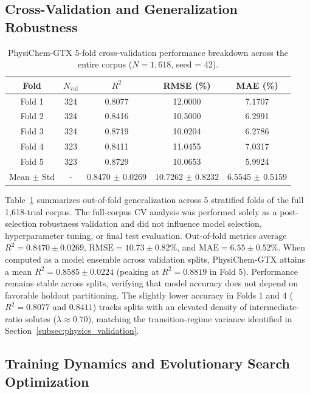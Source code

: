 \documentclass[11pt]{article}
\newcommand{\rsq}{R^{2}}
\begin{document}
\subsection{Cross-Validation and Generalization Robustness}
\label{subsec:cv}

\begin{table}[htbp]
\centering
\caption{PhysiChem-GTX 5-fold cross-validation performance breakdown across the entire corpus ($N=1{,}618$, seed = 42).}
\label{tab:cv}
\begin{tabular}{ccccc}
\toprule
Fold & $N_{\mathrm{val}}$ & $\rsq$ & RMSE (\%) & MAE (\%) \\
\midrule
Fold 1 & 324 & 0.8077 & 12.0000 & 7.1707 \\
Fold 2 & 324 & 0.8416 & 10.5000 & 6.2991 \\
Fold 3 & 324 & 0.8719 & 10.0204 & 6.2786 \\
Fold 4 & 323 & 0.8411 & 11.0455 & 7.0317 \\
Fold 5 & 323 & 0.8729 & 10.0653 & 5.9924 \\
\midrule
Mean $\pm$ Std & - & 0.8470 $\pm$ 0.0269 & 10.7262 $\pm$ 0.8232 & 6.5545 $\pm$ 0.5159 \\
\bottomrule
\end{tabular}%

\end{table}

Table~\ref{tab:cv} summarizes out-of-fold generalization across 5 stratified folds of the full 1,618-trial corpus. The full-corpus CV analysis was performed solely as a post-selection robustness validation and did not influence model selection, hyperparameter tuning, or final test evaluation. Out-of-fold metrics average $\rsq = 0.8470 \pm 0.0269$, $\mathrm{RMSE} = 10.73 \pm 0.82\%$, and $\mathrm{MAE} = 6.55 \pm 0.52\%$. When computed as a model ensemble across validation splits, PhysiChem-GTX attains a mean $\rsq = 0.8585 \pm 0.0224$ (peaking at $\rsq = 0.8819$ in Fold 5). Performance remains stable across splits, verifying that model accuracy does not depend on favorable holdout partitioning. The slightly lower accuracy in Folds 1 and 4 ($\rsq = 0.8077$ and $0.8411$) tracks splits with an elevated density of intermediate-ratio solutes ($\lambda \approx 0.70$), matching the transition-regime variance identified in Section~\ref{subsec:physics_validation}.

\subsection{Training Dynamics and Evolutionary Search Optimization}
\label{subsec:training_nas}
\end{document}
